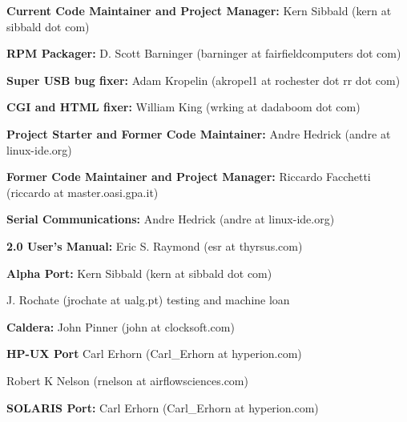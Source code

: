 \begin{description}

\item {\bf Current Code Maintainer and Project Manager:}
Kern Sibbald (kern at sibbald dot com)  

\item {\bf RPM Packager:}
D. Scott Barninger (barninger at fairfieldcomputers dot com)  

\item {\bf Super USB bug fixer:}
Adam Kropelin (akropel1 at rochester dot rr dot com)  

\item {\bf CGI and HTML fixer:}
William King (wrking at dadaboom dot com)  

\item {\bf Project Starter and Former Code Maintainer:}
Andre Hedrick (andre at linux-ide.org)  

\item {\bf Former Code Maintainer and Project Manager:}
Riccardo Facchetti (riccardo at master.oasi.gpa.it)  

\item {\bf Serial Communications:}
Andre Hedrick (andre at linux-ide.org)  

\item {\bf 2.0 User's Manual:}
Eric S. Raymond (esr at thyrsus.com)  

\item {\bf Alpha Port:}
Kern Sibbald (kern at sibbald dot com)  

J. Rochate (jrochate at ualg.pt) testing and machine loan  

\item {\bf Caldera:}
John Pinner (john at clocksoft.com)  

\item {\bf HP-UX Port}
Carl Erhorn (Carl\_Erhorn at hyperion.com)  

Robert K Nelson (rnelson at airflowsciences.com)  

\item {\bf SOLARIS Port:}
Carl Erhorn (Carl\_Erhorn at hyperion.com)  


\end{description}
